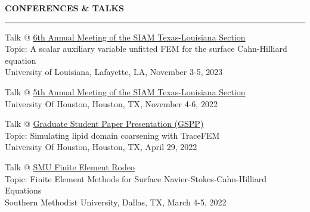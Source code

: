 \documentclass[10pt,letterpaper]{letter}
\newcommand{\gsect}[1]{\textcolor{codepurple}{\textbf{{\Large \uppercase{#1} }}} \\ \hrule}
\begin{document}

\gsect{Conferences \& Talks}
\begin{etaremune}
	\item Talk @ \href{https://userweb.ucs.louisiana.edu/~C00424602/SIAMTXLA2023/}{6th Annual Meeting of the SIAM Texas-Louisiana Section} \\
	Topic: A scalar auxiliary variable unfitted FEM for the surface Cahn-Hilliard equation\\
	University of Louisiana, Lafayette, LA, November 3-5, 2023
	
	\item Talk @ \href{https://www.math.uh.edu/siamtxla22/index.shtml}{5th Annual Meeting of the SIAM Texas-Louisiana Section} \\
	University Of Houston, Houston, TX, November 4-6, 2022
	
	\item Talk @ \href{https://uh.edu/nsm/math/news-events/stories/2022-math/gspp_2022/}{Graduate Student Paper Presentation (GSPP)} \\
	 Topic: Simulating lipid domain coarsening with TraceFEM\\
	 University Of Houston, Houston, TX, April 29, 2022
	
	\item Talk @ \href{https://people.smu.edu/sxu/2022-smu-fe-rodeo/}{SMU Finite Element Rodeo} \\ 
	Topic: Finite Element Methods for Surface Navier-Stokes-Cahn-Hilliard Equations \\
	Southern Methodist University, Dallas, TX, March 4-5, 2022
\end{etaremune}
\end{document}
